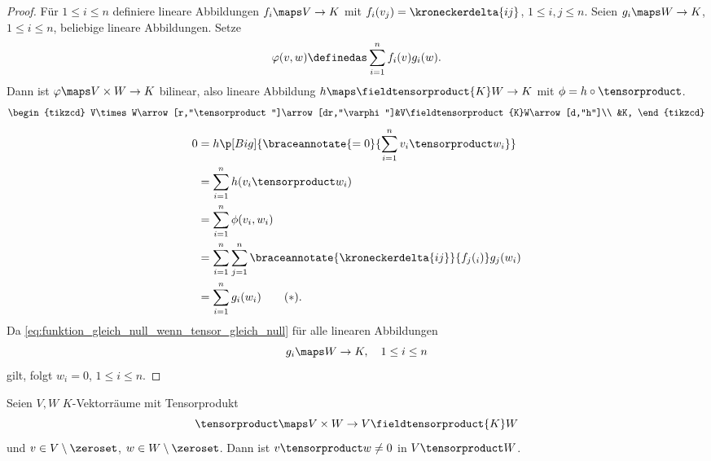 \begin{proof}
  Für \( 1\leq i\leq n \) definiere lineare Abbildungen \( f_i\maps V\to K \) mit \( f_i(v_j)=\kroneckerdelta{ij} \), \( 1\leq i,j\leq n \). Seien \( g_i\maps W\to K \), \( 1\leq i\leq n \), beliebige lineare Abbildungen. Setze 
  \begin{equation*}
    \varphi(v,w)\definedas \sum_{i=1}^{n}f_i(v)g_i(w).
  \end{equation*}
  Dann ist \( \varphi\maps V\times W\to K \) bilinear, also \texistsone lineare Abbildung \( h\maps \fieldtensorproduct{K}W\to K \) mit \( \phi=h\circ \tensorproduct \).
  \begin{equation*}
    \begin{tikzcd}
      V\times W\arrow[r,"\tensorproduct"]\arrow[dr,"\varphi"]&V\fieldtensorproduct{K}W\arrow[d,"h"]\\
      &K,
    \end{tikzcd}
  \end{equation*}
  \dh
  \begin{align*}
    0&=h\p[Big]{\braceannotate{=0}{\sum_{i=1}^{n}v_i\tensorproduct w_i}}\\
    &=\sum_{i=1}^{n}h(v_i\tensorproduct w_i)\\
    &=\sum_{i=1}^{n}\phi(v_i,w_i)\\
    &=\sum_{i=1}^{n}\sum_{j=1}^{n}\braceannotate{\kroneckerdelta{ij}}{f_j(_i)}g_j(w_i)\\
    &=\sum_{i=1}^{n}g_i(w_i)\tag{\( * \)}\label{eq:funktion_gleich_null_wenn_tensor_gleich_null}.
  \end{align*}
  Da \eqref{eq:funktion_gleich_null_wenn_tensor_gleich_null} für alle linearen Abbildungen
  \begin{equation*}
    g_i\maps W\to K,\quad 1\leq i\leq n
  \end{equation*}
  gilt, folgt \( w_i=0 \), \( 1\leq i\leq n \).
\end{proof}
\begin{korollar}
  Seien \( V,W \) \( K \)-Vektorräume mit Tensorprodukt
  \begin{equation*}
    \tensorproduct\maps V\times W\to V\fieldtensorproduct{K}W 
  \end{equation*}
  und \( v\in V\setminus \zeroset \), \( w\in W\setminus \zeroset  \). Dann ist \( v\tensorproduct w\neq 0 \) in \( V\tensorproduct W \).
\end{korollar}
